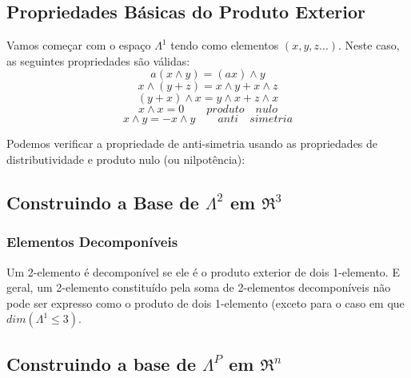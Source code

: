 \subsection{Propriedades Básicas do Produto Exterior}
Vamos começar com o espaço $\Lambda^1$ tendo como elementos $(x,y,z...)$. Neste caso, as seguintes propriedades são válidas:
$$
a(x\wedge y)=(ax)\wedge y
$$
$$
x\wedge(y+z)=x\wedge y + x\wedge z
$$
$$
(y+x) \wedge x = y \wedge x + z \wedge x
$$
$$
x \wedge x = 0 \qquad produto \quad nulo
$$
$$
x \wedge y = - x \wedge y \qquad anti \quad simetria
$$

Podemos verificar a propriedade de anti-simetria usando as propriedades de distributividade e produto nulo (ou nilpotência):


\subsection{Construindo a Base de $\Lambda^2$ em $\Re^3$}

\subsubsection{Elementos Decomponíveis}
Um 2-elemento é decomponível se ele é o produto exterior de dois 1-elemento. E geral, um 2-elemento constituído pela soma de 2-elementos decomponíveis não pode ser expresso como o produto de dois 1-elemento (exceto para o caso em que $dim(\Lambda^1\leq3)$.

\subsection{Construindo a base de $\Lambda^P$ em $\Re^n$}
